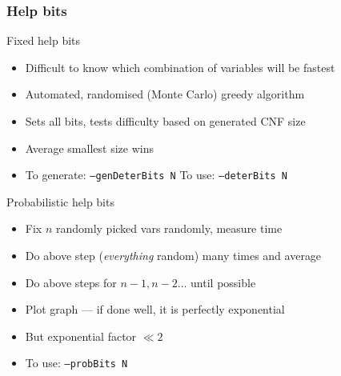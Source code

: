 \documentclass[xcolor=usenames,xcolor=svgnames,table,slidestop,compress,mathserif]{beamer}
\begin{document}
\frame
{\frametitle{Help bits}
\begin{beamerboxesrounded}[shadow=true]{Fixed help bits}
\begin{itemize}
\item Difficult to know which combination of variables will be fastest
\item Automated, randomised (Monte Carlo) greedy algorithm
\item Sets all bits, tests difficulty based on generated CNF size
\item Average smallest size wins
\item To generate: \texttt{--genDeterBits N} To use: \texttt{--deterBits N}
\end{itemize}
\end{beamerboxesrounded}

\smallskip

\begin{beamerboxesrounded}[shadow=true]{Probabilistic help bits}
\begin{itemize}
\item Fix $n$ randomly picked vars randomly, measure time
\item Do above step (\emph{everything} random) many times and average
\item Do above steps for $n-1,n-2\ldots$ until possible
\item Plot graph --- if done well, it is perfectly exponential
\item But exponential factor $\ll 2$
\item To use: \texttt{--probBits N}
\end{itemize}
\end{beamerboxesrounded}
}
\end{document}
